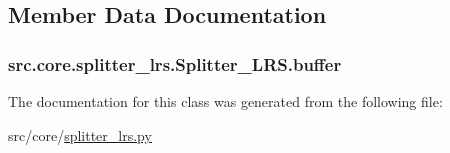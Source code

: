 \subsection{Member Data Documentation}
\hypertarget{classsrc_1_1core_1_1splitter__lrs_1_1Splitter__LRS_aa593047d817d9b5d67b0814fd400d78e}{}
\subsubsection[{buffer}]{\setlength{\rightskip}{0pt plus 5cm}src.\+core.\+splitter\+\_\+lrs.\+Splitter\+\_\+\+L\+R\+S.\+buffer}\label{classsrc_1_1core_1_1splitter__lrs_1_1Splitter__LRS_aa593047d817d9b5d67b0814fd400d78e}


The documentation for this class was generated from the following file\+:\begin{DoxyCompactItemize}
\item 
src/core/\hyperlink{splitter__lrs_8py}{splitter\+\_\+lrs.\+py}\end{DoxyCompactItemize}
